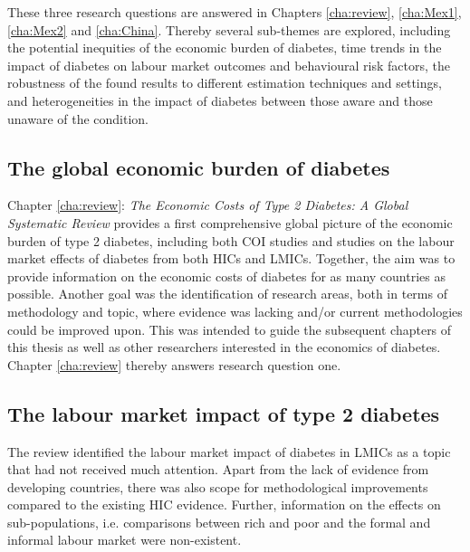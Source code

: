 These three research questions are answered in Chapters \ref{cha:review}, \ref{cha:Mex1}, \ref{cha:Mex2} and \ref{cha:China}. Thereby several sub-themes are explored, including the potential inequities of the economic burden of diabetes, time trends in the impact of diabetes on labour market outcomes and behavioural risk factors, the robustness of the found results to different estimation techniques and settings, and heterogeneities in the impact of diabetes between those aware and those unaware of the condition.


\subsection{The global economic burden of diabetes}

Chapter \ref{cha:review}: \textit{The Economic Costs of Type 2 Diabetes: A Global Systematic Review} provides a first comprehensive global picture of the economic burden of type 2 diabetes, including both \ac{COI} studies and studies on the labour market effects of diabetes from both \acp{HIC} and \acp{LMIC}. Together, the aim was to provide information on the economic costs of diabetes for as many countries as possible. Another goal was the identification of research areas, both in terms of methodology and topic, where evidence was lacking and/or current methodologies could be improved upon. This was intended to guide the subsequent chapters of this thesis as well as other researchers interested in the economics of diabetes. Chapter \ref{cha:review} thereby answers research question one.

\subsection{The labour market impact of type 2 diabetes}

The review identified the labour market impact of diabetes in \acp{LMIC} as a topic that had not received much attention. Apart from the lack of evidence from developing countries, there was also scope for methodological improvements compared to the existing \ac{HIC} evidence. Further, information on the effects on sub-populations, i.e. comparisons between rich and poor and the formal and informal labour market were non-existent.

